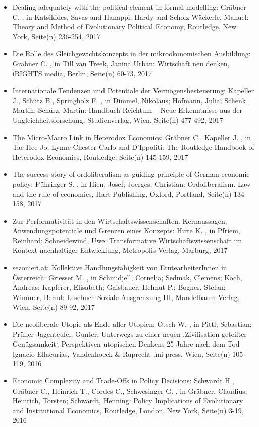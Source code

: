 \begin{itemize}
\item Dealing adequately with the political element in formal modelling: Gräbner C. , in Katsikides, Savas and Hanappi, Hardy and Scholz-Wäckerle, Manuel: Theory and Method of Evolutionary Political Economy, Routledge, New York, Seite(n) 236-254, 2017
\item Die Rolle des Gleichgewichtskonzepts in der mikroökonomischen Ausbildung: Gräbner C. , in Till van Treek, Janina Urban: Wirtschaft neu denken, iRIGHTS media, Berlin, Seite(n) 60-73, 2017
\item Internationale Tendenzen und Potentiale der Vermögensbesteuerung: Kapeller J., Schütz B., Springholz F. , in Dimmel, Nikolaus; Hofmann, Julia; Schenk, Martin; Schürz, Martin: Handbuch Reichtum – Neue Erkenntnisse aus der Ungleichheitsforschung, Studienverlag, Wien, Seite(n) 477-492, 2017
\item The Micro-Macro Link in Heterodox Economics: Gräbner C., Kapeller J. , in Tae-Hee Jo, Lynne Chester Carlo and D'Ippoliti: The Routledge Handbook of Heterodox Economics, Routledge, Seite(n) 145-159, 2017
\item The success story of ordoliberalism as guiding principle of German economic policy: Pühringer S. , in Hien, Josef; Joerges, Christian: Ordoliberalism. Law and the rule of economics, Hart Publishing, Oxford, Portland, Seite(n) 134-158, 2017
\item Zur Performativität in den Wirtschaftswissenschaften. Kernaussagen, Anwendungspotentiale und Grenzen eines Konzepts: Hirte K. , in Pfriem, Reinhard; Schneidewind, Uwe: Transformative Wirtschaftswissenschaft im Kontext nachhaltiger Entwicklung, Metropolis Verlag, Marburg, 2017
\item sezonieri.at: Kollektive Handlungsfähigkeit von ErntearbeiterInnen in Österreich: Griesser M. , in Schmidjell, Cornelia; Sedmak, Clemens; Koch, Andreas; Kapferer, Elisabeth; Gaisbauer, Helmut P.; Bogner, Stefan; Wimmer, Bernd: Lesebuch Soziale Ausgrenzung III, Mandelbaum Verlag, Wien, Seite(n) 89-92, 2017
\item Die neoliberale Utopie als Ende aller Utopien: Ötsch W. , in Pittl, Sebastian; Prüller-Jagenteufel; Gunter: Unterwegs zu einer neuen ‚Zivilisation geteilter Genügsamkeit‘. Perspektiven utopischen Denkens 25 Jahre nach dem Tod Ignacio Ellacurías, Vandenhoeck & Ruprecht uni press, Wien, Seite(n) 105-119, 2016
\item Economic Complexity and Trade-Offs in Policy Decisions: Schwardt H., Gräbner C., Heinrich T., Cordes C., Schwesinger G. , in Gräbner, Claudius; Heinrich, Torsten; Schwardt, Henning: Policy Implications of Evolutionary and Institutional Economics, Routledge, London, New York, Seite(n) 3-19, 2016

\end{itemize}
